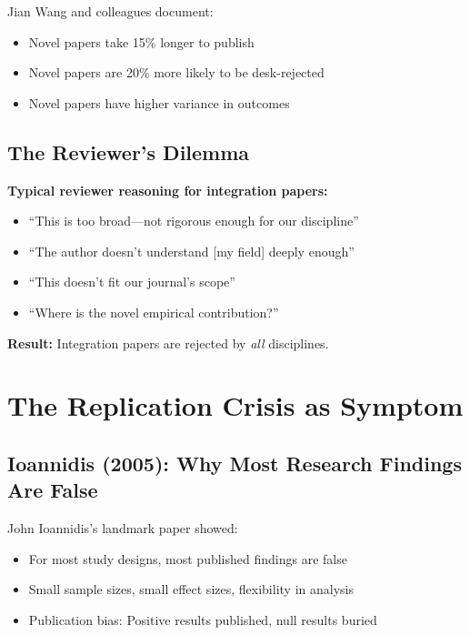 Jian Wang and colleagues document:
\begin{itemize}
\item Novel papers take 15\% longer to publish
\item Novel papers are 20\% more likely to be desk-rejected
\item Novel papers have higher variance in outcomes
\end{itemize}

\subsection{The Reviewer's Dilemma}

\begin{tcolorbox}[colback=yellow!5!white, colframe=yellow!75!black]
\textbf{Typical reviewer reasoning for integration papers:}
\begin{itemize}
\item ``This is too broad—not rigorous enough for our discipline''
\item ``The author doesn't understand [my field] deeply enough''
\item ``This doesn't fit our journal's scope''
\item ``Where is the novel empirical contribution?''
\end{itemize}

\textbf{Result:} Integration papers are rejected by \textit{all} disciplines.
\end{tcolorbox}



\section{The Replication Crisis as Symptom}
\label{sec:meta-replication}

\subsection{Ioannidis (2005): Why Most Research Findings Are False}

John Ioannidis's landmark paper showed:
\begin{itemize}
\item For most study designs, most published findings are false
\item Small sample sizes, small effect sizes, flexibility in analysis
\item Publication bias: Positive results published, null results buried
\end{itemize}

